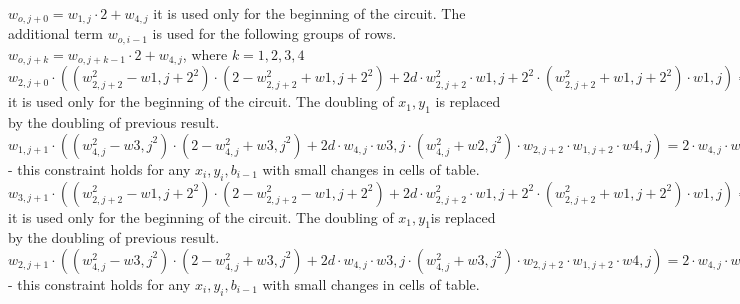 \begin{center}
$w_{o, j + 0} = w_{1, j} \cdot 2 + w_{4, j}$ it is used only for the beginning of the circuit. The additional term $w_{o, i - 1}$ is used for the following groups of rows. \\
$w_{o, j + k} = w_{o, j + k - 1} \cdot 2 + w_{4, j}$, where $k = 1, 2, 3, 4$\\

$w_{2, j + 0} \cdot ((w_{2, j + 2}^2 - w{1, j + 2}^2) \cdot (2 - w_{2, j + 2}^2 + w{1, j + 2}^2) + 2d \cdot w_{2, j + 2}^2 \cdot w{1, j + 2}^2 \cdot (w_{2, j + 2}^2 + w{1, j + 2}^2) \cdot w{1, j}) = 
2 \cdot w_{2, j + 2} \cdot (w_{2, j + 2} \cdot w_{1,j} + 1 - w_{1,j}) \cdot w{1, j + 2} \cdot (2 - w_{2, j + 2}^2 + w{1, j + 2}^2) 
+ w{1, j + 2} \cdot (w_{2, j + 2}^2 + w{1, j + 2}^2) \cdot (w_{2, j + 2}^2 - w{1, j + 2}^2)\cdot w{1, j}$ it is used only for the beginning of the circuit. The doubling of $x_1, y_1$ is replaced by the doubling of previous result.\\

$w_{1, j + 1} \cdot ((w_{4, j }^2 - w{3, j }^2) \cdot (2 - w_{4, j}^2 + w{3, j}^2) + 2d \cdot w_{4, j } \cdot w{3, j } \cdot (w_{4, j}^2 + w{2, j}^2) \cdot w_{2, j + 2} \cdot w_{1, j + 2} \cdot w{4, j}) = 
2 \cdot w_{4, j } \cdot w{3, j } \cdot (2 - w_{4, j }^2 + w{3, j }^2) \cdot (w_{2, j + 2} \cdot w_{4,j} + 1 - w_{4,j})  
+ w{3, j } \cdot (w_{4, j }^2 + w{3, j }^2) \cdot (w_{4, j }^2 - w{3, j }^2) \cdot w_{1, j + 2} \cdot w{4, j}$ - this constraint holds for any $x_i, y_i, b_{i -1}$ with small changes in cells of table. \\

$w_{3, j+1} \cdot ((w_{2, j + 2}^2 - w{1, j + 2}^2) \cdot (2 - w_{2, j + 2}^2 - w{1, j + 2}^2) + 2d \cdot w_{2, j + 2}^2 \cdot w{1, j + 2}^2 \cdot (w_{2, j + 2}^2 + w{1, j + 2}^2) \cdot w{1, j}) = 
2 \cdot w_{1, j + 2}^2 \cdot (w_{2, j + 2} \cdot (2 - w_{2, j + 2}^2 + w{1, j + 2}^2)\cdot w{1, j}  
+ (w_{2, j + 2}^2 - w{1, j + 2}^2)\cdot (w_{2, j + 2}^2 + w{1, j + 2}^2) \cdot (w_{2, j + 2} \cdot w_{1,j} + 1 - w_{1,j}) $ it is used only for the beginning of the circuit. The doubling of $x_1, y_1$is replaced by the doubling of previous result.\\

$w_{2, j + 1} \cdot ((w_{4, j }^2 - w{3, j }^2) \cdot (2 - w_{4, j}^2 + w{3, j}^2) + 2d \cdot w_{4, j } \cdot w{3, j } \cdot (w_{4, j}^2 + w{3, j}^2) \cdot w_{2, j + 2} \cdot w_{1, j + 2} \cdot w{4, j}) = 
2 \cdot w_{4, j } \cdot w{3, j } \cdot (2 - w_{4, j }^2 + w{3, j }^2) \cdot w_{1, j + 2} \cdot w_{4,j}  
+  (w_{2, j + 2} \cdot w_{4,j} + 1 - w_{4,j}) \cdot (w_{4, j }^2 + w{3, j }^2) \cdot (w_{4, j }^2 - w{3, j }^2) $ - this constraint holds for any $x_i, y_i, b_{i -1}$ with small changes in cells of table. \\

\end{center}